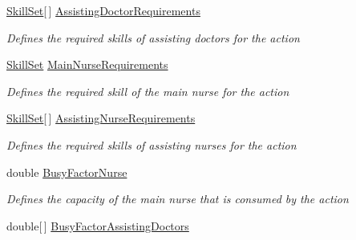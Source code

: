 \begin{DoxyCompactItemize}
\hyperlink{class_simulation_core_1_1_h_c_c_m_elements_1_1_skill_set}{Skill\+Set}\mbox{[}$\,$\mbox{]} \hyperlink{class_general_health_care_elements_1_1_general_classes_1_1_action_types_and_paths_1_1_action_type_class_aaac1fb6e608661d952ee50bf039e93c7}{Assisting\+Doctor\+Requirements}
\begin{DoxyCompactList}\small\item\em Defines the required skills of assisting doctors for the action \end{DoxyCompactList}\item 
\hyperlink{class_simulation_core_1_1_h_c_c_m_elements_1_1_skill_set}{Skill\+Set} \hyperlink{class_general_health_care_elements_1_1_general_classes_1_1_action_types_and_paths_1_1_action_type_class_a2efc81de0d542a4fe95e9a3afb7fe90c}{Main\+Nurse\+Requirements}
\begin{DoxyCompactList}\small\item\em Defines the required skill of the main nurse for the action \end{DoxyCompactList}\item 
\hyperlink{class_simulation_core_1_1_h_c_c_m_elements_1_1_skill_set}{Skill\+Set}\mbox{[}$\,$\mbox{]} \hyperlink{class_general_health_care_elements_1_1_general_classes_1_1_action_types_and_paths_1_1_action_type_class_af266857287fd31e4179432fff59ecbcc}{Assisting\+Nurse\+Requirements}
\begin{DoxyCompactList}\small\item\em Defines the required skills of assisting nurses for the action \end{DoxyCompactList}\item 
double \hyperlink{class_general_health_care_elements_1_1_general_classes_1_1_action_types_and_paths_1_1_action_type_class_afe9c3741513428cabbe8d26c75494e18}{Busy\+Factor\+Nurse}
\begin{DoxyCompactList}\small\item\em Defines the capacity of the main nurse that is consumed by the action \end{DoxyCompactList}\item 
double\mbox{[}$\,$\mbox{]} \hyperlink{class_general_health_care_elements_1_1_general_classes_1_1_action_types_and_paths_1_1_action_type_class_a507c6b866ff0b039213e81519e600181}{Busy\+Factor\+Assisting\+Doctors}

\end{DoxyCompactItemize}
